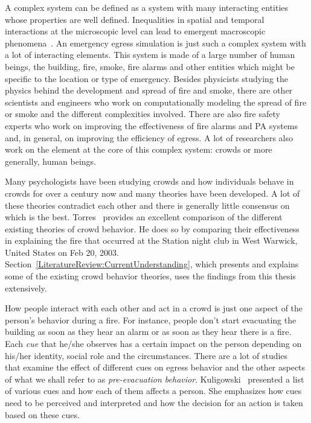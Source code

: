 A complex system can be defined as a system with many interacting entities whose properties are well defined. Inequalities in spatial and temporal interactions at the microscopic level can lead to emergent macroscopic phenomena~\cite{Sloot:1997ws}. An emergency egress simulation is just such a complex system with a lot of interacting elements. This system is made of a large number of human beings, the building, fire, smoke, fire alarms and other entities which might be specific to the location or type of emergency. Besides physicists studying the physics behind the development and spread of fire and smoke, there are other scientists and engineers who work on computationally modeling the spread of fire or smoke and the different complexities involved. There are also fire safety experts who work on improving the effectiveness of fire alarms and PA systems and, in general, on improving the efficiency of egress. A lot of researchers also work on the element at the core of this complex system: crowds or more generally, human beings.

Many psychologists have been studying crowds and how individuals behave in crowds for over a century now and many theories have been developed. A lot of these theories contradict each other and there is generally little consensus on which is the best. Torres~\cite{Torres:2010tj} provides an excellent comparison of the different existing theories of crowd behavior. He does so by comparing their effectiveness in explaining the fire that occurred at the Station night club in West Warwick, United States on Feb 20, 2003. Section~\ref{LiteratureReview:CurrentUnderstanding}, which presents and explains some of the existing crowd behavior theories, uses the findings from this thesis extensively.

How people interact with each other and act in a crowd is just one aspect of the person's behavior during a fire. For instance, people don't start evacuating the building as soon as they hear an alarm or as soon as they hear there is a fire. Each \emph{cue} that he/she observes has a certain impact on the person depending on his/her identity, social role and the circumstances. There are a lot of studies~\cite{Kuligowski:2009un,Ozel:2001tn,Torres:2010tj,Pires:2005gs,Sime:1983uy} that examine the effect of different cues on egress behavior and the other aspects of what we shall refer to as \emph{pre-evacuation behavior}. Kuligowski~\cite{Kuligowski:2009un} presented a list of various cues and how each of them affects a person. She emphasizes how cues need to be perceived and interpreted and how the decision for an action is taken based on these cues.

